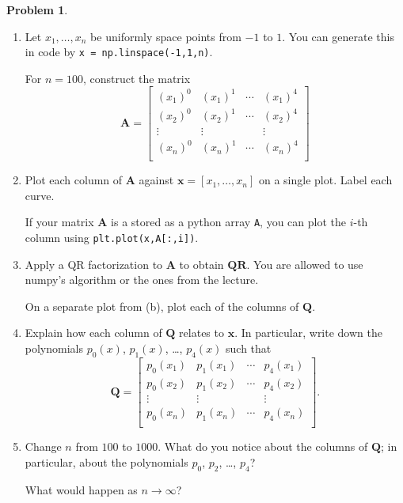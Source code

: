 \documentclass[12pt]{article}
\theoremstyle{definition}
\newtheorem{problem}{Problem}
\renewcommand{\vec}{\mathbf}
\begin{document}
\begin{problem}

    \begin{enumerate}
        \item
            Let $x_1, \ldots, x_n$ be uniformly space points from $-1$ to $1$.
            You can generate this in code by \lstinline{x = np.linspace(-1,1,n)}.

            For $n=100$, construct the matrix
            \[
                \vec{A} = 
                \begin{bmatrix}
                    (x_1)^0 & (x_1)^1 & \cdots & (x_1)^4 \\
                    (x_2)^0 & (x_2)^1 & \cdots & (x_2)^4 \\ 
                    \vdots & \vdots & & \vdots \\
                    (x_n)^0 & (x_n)^1 & \cdots & (x_n)^4 \\
                \end{bmatrix}
            \]
        \item 
            Plot each column of $\vec{A}$ against $\vec{x} = [x_1, \ldots, x_n]$ on a single plot. 
            Label each curve. 
            
            If your matrix $\vec{A}$ is a stored as a python array \lstinline{A}, you can plot the $i$-th column using \lstinline{plt.plot(x,A[:,i])}.

        \item Apply a QR factorization to $\vec{A}$ to obtain $\vec{Q}\vec{R}$. You are allowed to use numpy's algorithm or the ones from the lecture.

            On a separate plot from (b), plot each of the columns of $\vec{Q}$.

        \item 
            Explain how each column of $\vec{Q}$ relates to $\vec{x}$.
            In particular, write down the polynomials $p_0(x)$, $p_1(x)$, \ldots, $p_4(x)$ such that 
            \[
                \vec{Q} = 
                \begin{bmatrix}
                    p_0(x_1) & p_1(x_1) & \cdots & p_4(x_1) \\
                    p_0(x_2) & p_1(x_2) & \cdots & p_4(x_2) \\ 
                    \vdots & \vdots & & \vdots \\
                    p_0(x_n) & p_1(x_n) & \cdots & p_4(x_n) \\
                \end{bmatrix}.
            \]
        \item Change $n$ from $100$ to $1000$. 
            What do you notice about the columns of $\vec{Q}$; in particular, about the polynomials $p_0$, $p_2$, \ldots, $p_4$?
            
            What would happen as $n\to\infty$?
    \end{enumerate}

\end{problem}
\end{document}
